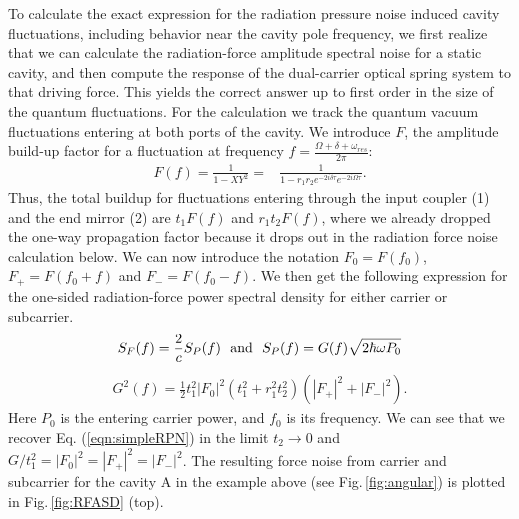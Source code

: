To calculate the exact expression for the radiation pressure noise induced cavity fluctuations, including behavior near the cavity pole frequency, we first realize that we can calculate the radiation-force amplitude spectral noise for a static cavity, and then compute the response of the dual-carrier optical spring system to that driving force. This yields the correct answer up to first order in the size of the quantum fluctuations. For the calculation we track the quantum vacuum fluctuations entering at both ports of the cavity. We introduce $F$, the amplitude build-up factor for a fluctuation at frequency $f = \frac{\Omega + \delta + \omega_{res}}{2 \pi}$:
\begin{align}
\label{eqn:RPNfunction}
F(f) = \frac{1}{1-XY^2}  =& \frac{1}{1-r_1r_2e^{-2 i \delta\tau}e^{-2 i \Omega\tau}}.%
\end{align}
Thus, the total buildup for fluctuations entering through the input coupler (1) and the end mirror (2) are  $t_1 F(f)$ and $r_1 t_2 F(f)$, 
where we already dropped the one-way propagation factor because it drops out in the radiation force noise calculation below. 
We can now introduce the notation $F_0=F(f_0)$, $F_+=F(f_0+f)$ and $F_-=F(f_0-f)$. We then get the following expression for the one-sided radiation-force power spectral density for either carrier or subcarrier.
\begin{align}
\label{eqn:RPN_P}
S_F (f) = \frac{2}{c} S_P (f) \,\,\,\, {\rm and} \,\,\,\, S_P(f) = G(f)\sqrt{2\hbar\omega P_0}
\end{align}
\begin{align}
\label{eqn:RPN}
G^2(f) = \frac{1}{2}t_1^2|F_0|^2 (t_1^2 \!\!+\! r_1^2t_2^2)( |F_+|^2 \!\!+\!  |F_-|^2).
\end{align}
Here $P_0$ is the entering carrier power, and $f_0$ is its frequency. We can see that we recover Eq. (\ref{eqn:simpleRPN}) in the limit $t_2 \rightarrow 0$ and $G/t_1^2=|F_0|^2=|F_+|^2=|F_-|^2$. The resulting force noise from carrier and subcarrier for the cavity A in the example above (see Fig.\,\ref{fig:angular}) is plotted in Fig.\,\ref{fig:RFASD} (top).
